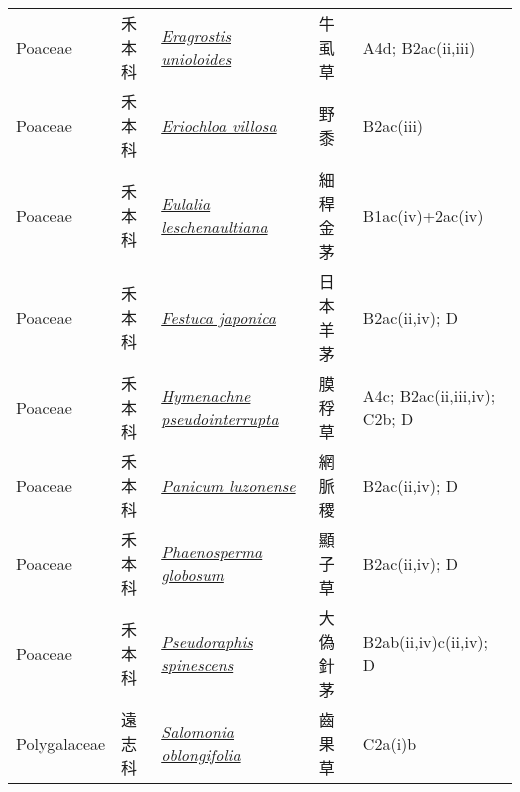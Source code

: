 {\begin{longtable}{L{2.5cm}L{2cm}L{5cm}L{2.5cm}L{3cm}}
    Poaceae & 禾本科 & \href{http://www.theplantlist.org/tpl1.1/search?q=Eragrostis+unioloides}{\textit{Eragrostis unioloides} } & 牛虱草 & A4d; B2ac(ii,iii)    \\
    Poaceae & 禾本科 & \href{http://www.theplantlist.org/tpl1.1/search?q=Eriochloa+villosa}{\textit{Eriochloa villosa} } & 野黍 & B2ac(iii)    \\
    Poaceae & 禾本科 & \href{http://www.theplantlist.org/tpl1.1/search?q=Eulalia+leschenaultiana}{\textit{Eulalia leschenaultiana} } & 細稈金茅 & B1ac(iv)+2ac(iv)    \\
    Poaceae & 禾本科 & \href{http://www.theplantlist.org/tpl1.1/search?q=Festuca+japonica}{\textit{Festuca japonica} } & 日本羊茅 & B2ac(ii,iv); D    \\
    Poaceae & 禾本科 & \href{http://www.theplantlist.org/tpl1.1/search?q=Hymenachne+pseudointerrupta}{\textit{Hymenachne pseudointerrupta} } & 膜稃草 & A4c; B2ac(ii,iii,iv); C2b; D    \\
    Poaceae & 禾本科 & \href{http://www.theplantlist.org/tpl1.1/search?q=Panicum+luzonense}{\textit{Panicum luzonense} } & 網脈稷 & B2ac(ii,iv); D    \\
    Poaceae & 禾本科 & \href{http://www.theplantlist.org/tpl1.1/search?q=Phaenosperma+globosum}{\textit{Phaenosperma globosum} } & 顯子草 & B2ac(ii,iv); D    \\
    Poaceae & 禾本科 & \href{http://www.theplantlist.org/tpl1.1/search?q=Pseudoraphis+spinescens}{\textit{Pseudoraphis spinescens} } & 大偽針茅 & B2ab(ii,iv)c(ii,iv); D    \\
    Polygalaceae & 遠志科 & \href{http://www.theplantlist.org/tpl1.1/search?q=Salomonia+oblongifolia}{\textit{Salomonia oblongifolia} } & 齒果草 & C2a(i)b    \\

\end{longtable}}
